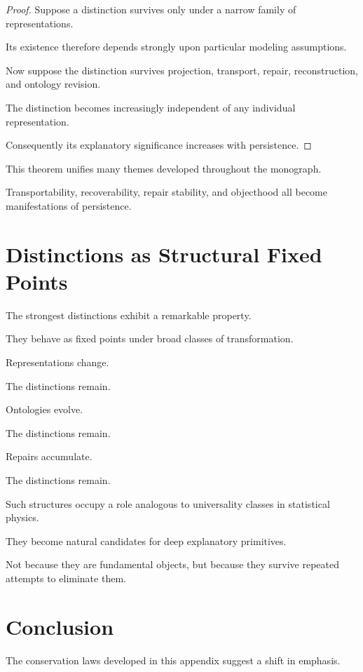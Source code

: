 \documentclass[11pt,oneside,openany]{book}
\begin{document}
\begin{proof}

Suppose a distinction survives only under a narrow family of representations.

Its existence therefore depends strongly upon particular modeling assumptions.

Now suppose the distinction survives projection, transport, repair, reconstruction, and ontology revision.

The distinction becomes increasingly independent of any individual representation.

Consequently its explanatory significance increases with persistence.

\end{proof}

This theorem unifies many themes developed throughout the monograph.

Transportability, recoverability, repair stability, and objecthood all become manifestations of persistence.

\section{Distinctions as Structural Fixed Points}

The strongest distinctions exhibit a remarkable property.

They behave as fixed points under broad classes of transformation.

Representations change.

The distinctions remain.

Ontologies evolve.

The distinctions remain.

Repairs accumulate.

The distinctions remain.

Such structures occupy a role analogous to universality classes in statistical physics.

They become natural candidates for deep explanatory primitives.

Not because they are fundamental objects, but because they survive repeated attempts to eliminate them.

\section{Conclusion}

The conservation laws developed in this appendix suggest a shift in emphasis.
\end{document}
